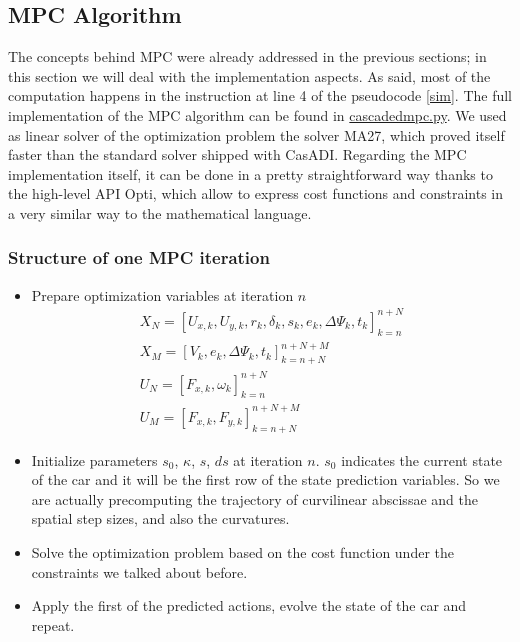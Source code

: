 \documentclass[a4paper, onecolumn, 12pt]{article}
\begin{document}
\subsection{MPC Algorithm}
The concepts behind MPC were already addressed in the previous sections; in this
section we will deal with the implementation aspects. As said, most of the
computation happens in the instruction at line 4 of the pseudocode \ref{sim}.
The full implementation of the MPC algorithm can be found in
\href{https://github.com/neverorfrog/vehicle-control/tree/main/controllers/mpc}{cascadedmpc.py}.
We used as linear solver of the optimization problem the solver MA27, which
proved itself faster than the standard solver shipped with CasADI. Regarding the
MPC implementation itself, it can be done in a pretty straightforward way thanks
to the high-level API Opti, which allow to express cost functions and
constraints in a very similar way to the mathematical language.\\
\subsubsection*{Structure of one MPC iteration}
\begin{itemize}
    \item Prepare optimization variables at iteration $n$
    \begin{subequations}
        \begin{eqnarray}
            X_N = [U_{x,k}, U_{y,k}, r_k, \delta_k, s_k, e_k, \Delta \varPsi_k, t_k]_{k=n}^{n+N} \\
            X_M = [V_k, e_k, \Delta \varPsi_k, t_k]_{k=n+N}^{n+N+M} \\
            U_N = [F_{x,k}, \omega_k]_{k=n}^{n+N} \\
            U_M = [F_{x,k}, F_{y,k}]_{k=n+N}^{n+N+M}
        \end{eqnarray}
    \end{subequations}
    \item Initialize parameters $s_0$, $\kappa$, $s$, $ds$ at iteration $n$.
    $s_0$ indicates the current state of the car and it will be the first row of
    the state prediction variables. So we are actually precomputing the
    trajectory of curvilinear abscissae and the spatial step sizes, and also the
    curvatures.
    \item Solve the optimization problem based on the cost function under the
    constraints we talked about before.
    \item Apply the first of the predicted actions, evolve the state of the car and repeat.

\end{itemize}
\end{document}
